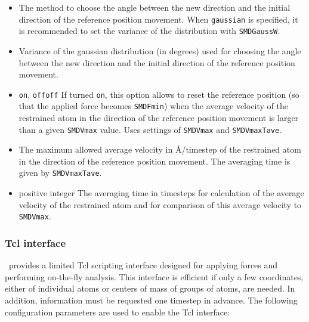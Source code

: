 \begin{itemize}
\item
{}
{The method to choose the angle between the new direction and the
initial direction of the reference position movement. When
{\tt gaussian} is specified, it is recommended to set the variance of
the distribution with {\tt SMDGaussW}.}

\item
{}
{Variance of the gaussian distribution (in degrees) used
for choosing the angle between the new direction and the
initial direction of the reference position movement.}


\item
{}
{{\tt on}, {\tt off}}{{\tt off}}
{If turned {\tt on}, this option allows to reset
the reference position (so that the applied force becomes
{\tt SMDFmin}) when the average velocity of the
restrained atom in the direction of the reference position movement is
larger than a given {\tt SMDVmax} value. Uses settings of 
{\tt SMDVmax} and {\tt SMDVmaxTave}.}

\item
{} {The maximum allowed average velocity in
\AA/timestep of the restrained atom in the direction of the reference
position movement. The averaging time is given by {\tt SMDVmaxTave}.}

\item
{}
{positive integer} {The averaging time in timesteps for calculation of
the average velocity of the restrained atom and for comparison of this
average velocity to
{\tt SMDVmax}.}
\end{itemize}

\subsubsection{Tcl interface}

\NAMD\ provides a limited Tcl scripting interface designed for applying forces and performing on-the-fly analysis.
This interface is efficient if only a few coordinates, either of individual atoms or centers of mass of groups of atoms, are needed.
In addition, information must be requested one timestep in advance.
The following configuration parameters are used to enable the Tcl interface:

